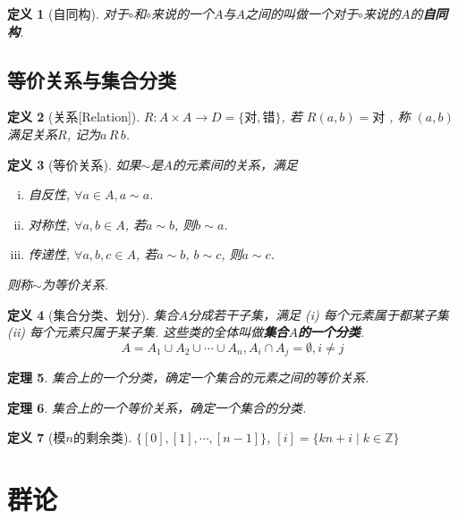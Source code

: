 \documentclass[UTF8]{ctexart}
\newtheorem{Definition}{定义}%
\newtheorem{Theorem}[Definition]{定理}
\begin{document}
\begin{Definition}[自同构]
对于$\circ$和$\circ$来说的一个$A$与$A$之间的\;\;叫做一个对于$\circ$来说的$A$的\textbf{自同构}.
\end{Definition}

\subsection{等价关系与集合分类}

\begin{Definition}[关系\mbox{[Relation]}]
$R: A \times A \rightarrow D = \{\text{对}, \text{错}\} $, 
若
$R(a, b) = \text{对}$
, 称
$(a, b)$
满足关系$R$, 记为$a \, R \, b$.
\end{Definition}

\begin{Definition}[等价关系]
如果$\sim$是$A$的元素间的关系，满足 
\begin{enumerate}[i)]
\item 自反性, $\forall a \in A, a \sim a$.
\item 对称性, $\forall a, b \in A$, 若$a \sim b$, 则$b \sim a$.
\item 传递性, $\forall a, b, c \in A$, 若$a \sim b$, $b\sim c$, 则$a \sim c$.
\end{enumerate}
则称$\sim$为等价关系.
\end{Definition}

\begin{Definition}[集合分类、划分]
集合$A$分成若干子集，满足 (i) 每个元素属于都某子集 (ii) 每个元素只属于某子集. 这些类的全体叫做\textbf{集合$A$的一个分类}.
$$ A = A_1 \cup A_2 \cup \cdots \cup A_n, A_i \cap A_j = \emptyset, i \neq j$$
\end{Definition}

\begin{Theorem}
集合上的一个分类，确定一个集合的元素之间的等价关系.
\end{Theorem}

\begin{Theorem}
集合上的一个等价关系，确定一个集合的分类.
\end{Theorem}

\begin{Definition}[模$n$的剩余类]
$ \{ [0], [1], \cdots, [n-1] \} $, $[i] = \{ k n + i \mid k \in \mathbb{Z} \}$
\end{Definition}

\section{群论}
\end{document}
